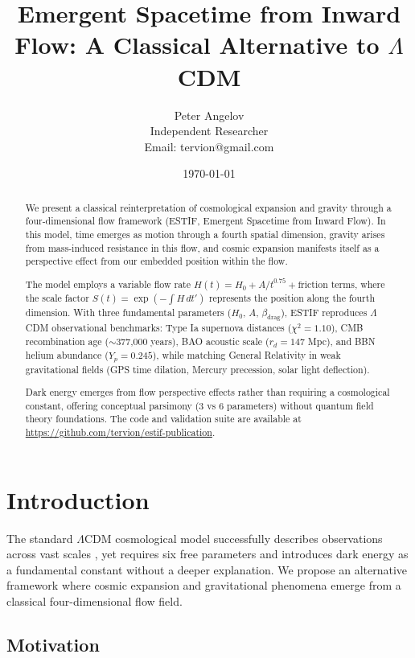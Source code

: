 \documentclass[12pt,a4paper]{article}
\title{Emergent Spacetime from Inward Flow: A Classical Alternative to $\Lambda$CDM}
\author{Peter Angelov\\
\small Independent Researcher\\
\small Email: tervion@gmail.com}
\date{\today}
\begin{document}
\maketitle

\begin{abstract}
We present a classical reinterpretation of cosmological expansion and gravity through a four-dimensional flow framework (ESTIF, Emergent Spacetime from Inward Flow). In this model, time emerges as motion through a fourth spatial dimension, gravity arises from mass-induced resistance in this flow, and cosmic expansion manifests itself as a perspective effect from our embedded position within the flow.

The model employs a variable flow rate $H(t) = H_0 + A/t^{0.75} + \text{friction terms}$, where the scale factor $S(t) = \exp(-\int H\,dt')$ represents the position along the fourth dimension. With three fundamental parameters ($H_0$, $A$, $\beta_{\text{drag}}$), ESTIF reproduces $\Lambda$CDM observational benchmarks: Type Ia supernova distances ($\chi^2 = 1.10$), CMB recombination age ($\sim$377,000 years), BAO acoustic scale ($r_d = 147$ Mpc), and BBN helium abundance ($Y_p = 0.245$), while matching General Relativity in weak gravitational fields (GPS time dilation, Mercury precession, solar light deflection).

Dark energy emerges from flow perspective effects rather than requiring a cosmological constant, offering conceptual parsimony (3 vs 6 parameters) without quantum field theory foundations. The code and validation suite are available at \url{https://github.com/tervion/estif-publication}.
\end{abstract}

\section{Introduction}

The standard $\Lambda$CDM cosmological model successfully describes observations across vast scales \cite{PlanckCollaboration2018}, yet requires six free parameters and introduces dark energy as a fundamental constant without a deeper explanation. We propose an alternative framework where cosmic expansion and gravitational phenomena emerge from a classical four-dimensional flow field.

\subsection{Motivation}
\end{document}
